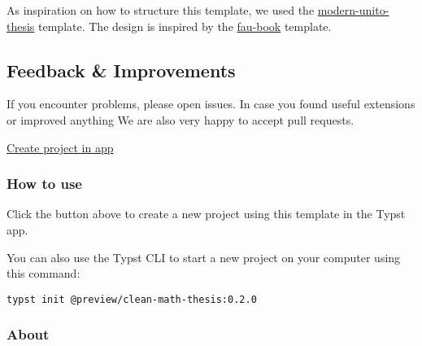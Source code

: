 As inspiration on how to structure this template, we used the
\href{https://typst.app/universe/package/modern-unito-thesis}{modern-unito-thesis}
template. The design is inspired by the
\href{https://github.com/FAU-AMMN/fau-book}{fau-book} template.

\subsection{Feedback \& Improvements}\label{feedback-improvements}

If you encounter problems, please open issues. In case you found useful
extensions or improved anything We are also very happy to accept pull
requests.

\href{/app?template=clean-math-thesis&version=0.2.0}{Create project in
app}

\subsubsection{How to use}\label{how-to-use}

Click the button above to create a new project using this template in
the Typst app.

You can also use the Typst CLI to start a new project on your computer
using this command:

\begin{verbatim}
typst init @preview/clean-math-thesis:0.2.0
\end{verbatim}



\subsubsection{About}\label{about}

